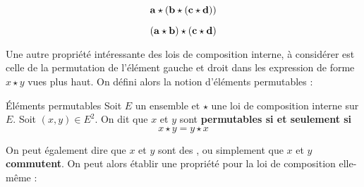 \documentclass[a4paper,french,bookmarks]{article}
\begin{document}
\begin{example}{}{}
\begin{minipage}[t]{.19\linewidth}
\end{minipage}
\begin{minipage}[t]{.19\linewidth}
\[ \bf{a \star (b \star (c \star d))}\]
\centering{}
\end{minipage}
\begin{minipage}[t]{.19\linewidth}
\[ \bf{(a \star b) \star (c \star d)}\]
\centering{}
\end{minipage}
\end{example}

Une autre propriété intéressante des lois de composition interne, à considérer est celle de la permutation de l'élément gauche et droit dans les expression de forme $x \star y$ vues plus haut. On défini alors la notion d'éléments permutables :

\begin{definition}{Éléments permutables}{}
    Soit $E$ un ensemble et $\star$ une loi de composition interne sur $E$. Soit $(x, y) \in E^2$. On dit que $x$ et $y$ sont \bf{permutables} si et seulement si
    \[ x \star y = y \star x\]
\end{definition}

On peut également dire que $x$ et $y$ sont des , ou simplement que $x$ et $y$ \textbf{commutent}.
On peut alors établir une propriété pour la loi de composition elle-même :
\end{document}
